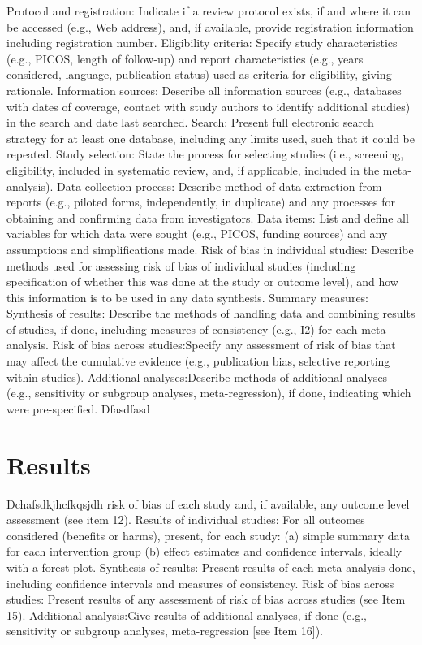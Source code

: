 \documentclass{article}\usepackage[]{graphicx}\usepackage[]{color}
\begin{document}
                Protocol and registration: Indicate if a review protocol exists, if and where it can be accessed (e.g., Web address), and, if available, provide registration information including registration number.
                Eligibility criteria: Specify study characteristics (e.g., PICOS, length of follow-up) and report characteristics (e.g., years considered, language, publication status) used as criteria for eligibility, giving rationale.
                Information sources: Describe all information sources (e.g., databases with dates of coverage, contact with study authors to identify additional studies) in the search and date last searched.
                Search: Present full electronic search strategy for at least one database, including any limits used, such that it could be repeated.
                Study selection: State the process for selecting studies (i.e., screening, eligibility, included in systematic review, and, if applicable, included in the meta-analysis).
                Data collection process: Describe method of data extraction from reports (e.g., piloted forms, independently, in duplicate) and any processes for obtaining and confirming data from investigators.
                Data items: List and define all variables for which data were sought (e.g., PICOS, funding sources) and any assumptions and simplifications made.
                Risk of bias in individual studies: Describe methods used for assessing risk of bias of individual studies (including specification of whether this was done at the study or outcome level), and how this information is to be used in any data synthesis.
                Summary measures:
                Synthesis of results: Describe the methods of handling data and combining results of studies, if done, including measures of consistency (e.g., I2) for each meta-analysis.
                Risk of bias across studies:Specify any assessment of risk of bias that may affect the cumulative evidence (e.g., publication bias, selective reporting within studies).
                Additional analyses:Describe methods of additional analyses (e.g., sensitivity or subgroup analyses, meta-regression), if done, indicating which were pre-specified.
                Dfasdfasd

\section{Results}

Dchafsdkjhcfkqsjdh risk of bias of each study and, if available, any outcome level assessment (see item 12).
                Results of individual studies: For all outcomes considered (benefits or harms), present, for each study: (a) simple summary data for each intervention group (b) effect estimates and confidence intervals, ideally with a forest plot.
                Synthesis of results: Present results of each meta-analysis done, including confidence intervals and measures of consistency.
                Risk of bias across studies: Present results of any assessment of risk of bias across studies (see Item 15).
                Additional analysis:Give results of additional analyses, if done (e.g., sensitivity or subgroup analyses, meta-regression [see Item 16]).
                
\end{document}
